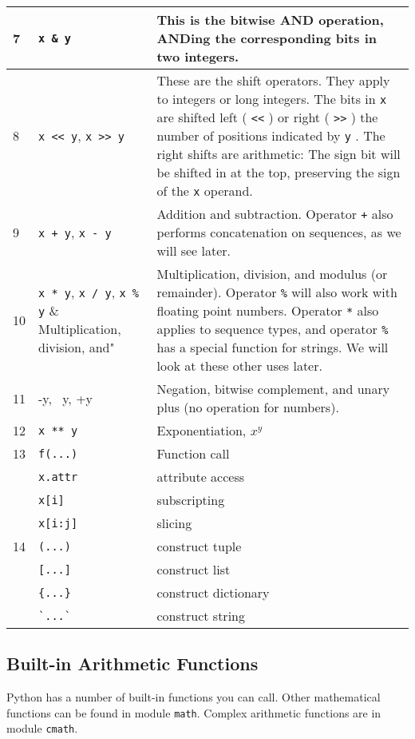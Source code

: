 \begin{longtable}{l|p{3cm}|p{7cm}}
  7 & \verb"x & y" & This is the bitwise AND operation,
ANDing the corresponding bits in two integers. \\
%
\midrule

8 & \verb"x << y", \verb"x >> y" & These are the shift operators.
They apply to integers or long integers. The bits in \texttt{x} are
shifted left ( \texttt{\textless{}\textless{}} ) or right (
\texttt{\textgreater{}\textgreater{}} ) the number of positions indicated
by \texttt{y} . The right shifts are arithmetic: The sign bit will be
shifted in at the top, preserving the sign of the \texttt{x} operand. \\
%
\midrule
9 & \verb"x + y", \verb"x - y" & Addition and subtraction. Operator
\texttt{+} also performs concatenation on sequences, as we will see later.\\
%
\midrule
10 & \verb"x * y", \verb"x / y", \verb"x % y" & Multiplication, division, and
modulus (or remainder). Operator \texttt{\%} will also work with floating
point numbers. Operator \texttt{*} also applies to sequence types, and
operator \texttt{\%} has a special function for strings. We will look at
these other uses later.\\
%
\midrule
11 & -y, ~y, +y & Negation, bitwise complement, and
unary plus (no operation for numbers).\\
%
\midrule
12 & \verb"x ** y" & Exponentiation, $x^y$ \\
%
\midrule
13 & \verb"f(...)" & Function call \\
%
 & \verb"x.attr" & attribute access \\
%
 & \verb"x[i]" & subscripting \\
%
 & \verb"x[i:j]" & slicing \\
%
\midrule
14 & \verb"(...)" & construct tuple \\
%
 & \verb"[...]" & construct list \\
%
 & \verb"{...}" & construct dictionary \\
%
 & \verb"`...`" & construct string \\
%
\bottomrule
\end{longtable}


\subsection{Built-in Arithmetic Functions}
\label{built-in-arithmetic-functions}

Python has a number of built-in functions you can call.
Other mathematical functions can be found in module \texttt{math}.
Complex arithmetic functions are in module \texttt{cmath}.


